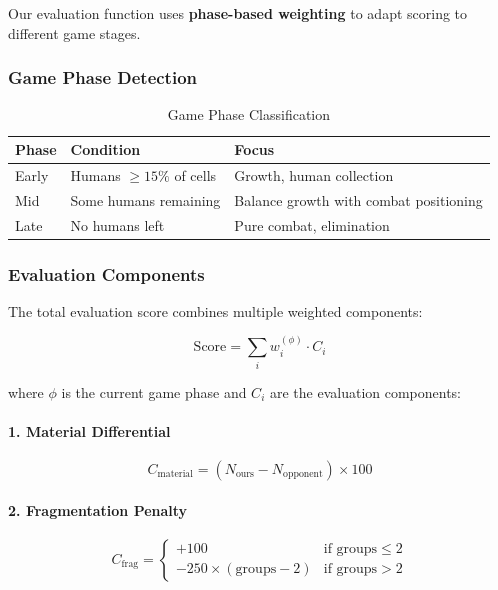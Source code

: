 \documentclass[11pt,a4paper]{article}
\begin{document}
Our evaluation function uses \textbf{phase-based weighting} to adapt scoring to different game stages.

\subsubsection{Game Phase Detection}

\begin{table}[H]
\centering
\caption{Game Phase Classification}
\begin{tabular}{@{}llp{6cm}@{}}
\toprule
\textbf{Phase} & \textbf{Condition} & \textbf{Focus} \\
\midrule
Early & Humans $\geq 15\%$ of cells & Growth, human collection \\
Mid & Some humans remaining & Balance growth with combat positioning \\
Late & No humans left & Pure combat, elimination \\
\bottomrule
\end{tabular}
\end{table}

\subsubsection{Evaluation Components}

The total evaluation score combines multiple weighted components:

\begin{equation}
\text{Score} = \sum_{i} w_i^{(\phi)} \cdot C_i
\label{eq:eval_total}
\end{equation}

where $\phi$ is the current game phase and $C_i$ are the evaluation components:

\paragraph{1. Material Differential}
\begin{equation}
C_{\text{material}} = (N_{\text{ours}} - N_{\text{opponent}}) \times 100
\end{equation}

\paragraph{2. Fragmentation Penalty}
\begin{equation}
C_{\text{frag}} = \begin{cases}
+100 & \text{if groups} \leq 2 \\
-250 \times (\text{groups} - 2) & \text{if groups} > 2
\end{cases}
\end{equation}
\end{document}
